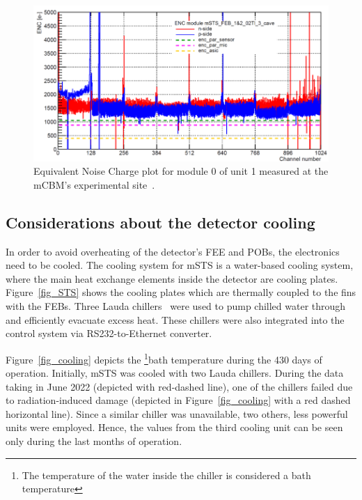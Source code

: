 \begin{figure}[!h]
\centering
\includegraphics[width=0.95\columnwidth]{Chapter6/DCS/images/U1M1_ENC.png}
\caption{Equivalent Noise Charge plot for module 0 of unit 1 measured at the \gls{mCBM}'s experimental site~\cite{RodriguezRodriguez2020}.}
\label{fig_msts_ENC2}
\end{figure}


\subsection{Considerations about the detector cooling}
\label{msts_cooling}
In order to avoid overheating of the detector's \gls{FEE} and \glspl{POB}, the electronics need to be cooled. The cooling system for \gls{mSTS} is a water-based cooling system, where the main heat exchange elements inside the detector are cooling plates.  Figure~\ref{fig_STS} shows the cooling plates which are thermally coupled to the fins with the \glspl{FEB}. Three Lauda chillers~\cite{Lauda1} were used to pump chilled water through and efficiently evacuate excess heat. These chillers were also integrated into the control system via RS232-to-Ethernet converter.

Figure~\ref{fig_cooling} depicts the \footnote{The temperature of the water inside the chiller is considered a bath temperature}{bath temperature} during the 430 days of operation. Initially, \gls{mSTS} was cooled with two Lauda chillers. During the data taking in June 2022 (depicted with red-dashed line), one of the chillers failed due to radiation-induced damage (depicted in Figure~\ref{fig_cooling} with a red dashed horizontal line). Since a similar chiller was unavailable, two others, less powerful units were employed. Hence, the values from the third cooling unit can be seen only during the last months of operation. 

